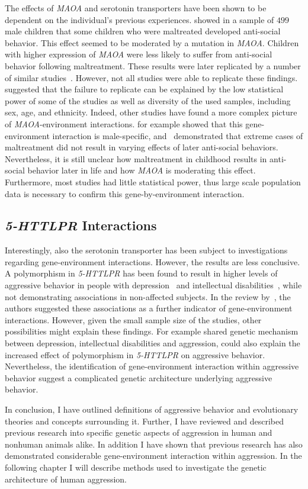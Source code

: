 The effects of \textit{MAOA} and serotonin transporters have been shown to be dependent on the individual's previous experiences.
\citet{Caspi2002} showed in a sample of $499$ male children that some children who were maltreated developed anti-social behavior.
This effect seemed to be moderated by a mutation in \textit{MAOA}.
Children with higher expression of \textit{MAOA} were less likely to suffer from anti-social behavior following maltreatment.
These results were later replicated by a number of similar studies~\cite{KimCohen2006}.
However, not all studies were able to replicate these findings.
\citet{Anholt2012} suggested that the failure to replicate can be explained by the low statistical power of some of the studies as well as diversity of the used samples, including sex, age, and ethnicity.
Indeed, other studies have found a more complex picture of \textit{MAOA}-environment interactions.
\citet{Huang2004} for example showed that this gene-environment interaction is male-specific, and~\citet{Weder2009} demonstrated that extreme cases of maltreatment did not result in varying effects of later anti-social behaviors.
Nevertheless, it is still unclear how maltreatment in childhood results in anti-social behavior later in life and how \textit{MAOA} is moderating this effect.
Furthermore, most studies had little statistical power,
thus large scale population data is necessary to confirm this gene-by-environment interaction.

\subsection{\textit{5-HTTLPR} Interactions}
\label{sub:httlpr_interactions}
Interestingly, also the serotonin transporter has been subject to investigations regarding gene-environment interactions.
However, the results are less conclusive.
A polymorphism in \textit{5-HTTLPR} has been found to result in higher levels of aggressive behavior in  people with depression~\cite{Gonda2011} and intellectual disabilities~\cite{May2010}, while not demonstrating associations in non-affected subjects.
In the review by~\citet{Anholt2012}, the authors suggested these associations as a further indicator of gene-environment interactions.
However, given the small sample size of the studies, other possibilities might explain these findings.
For example shared genetic mechanism between depression, intellectual disabilities and aggression, could also explain the increased effect of polymorphism in \textit{5-HTTLPR} on aggressive behavior. 
Nevertheless, the identification of gene-environment interaction within aggressive behavior suggest a complicated genetic architecture underlying aggressive behavior.
\bigskip

In conclusion, I have outlined definitions of aggressive behavior and evolutionary theories and concepts surrounding it.
Further, I have reviewed and described previous research into specific genetic aspects of aggression in human and nonhuman animals alike.
In addition I have shown that previous research has also demonstrated considerable gene-environment interaction within aggression.
In the following chapter I will describe methods used to investigate the genetic architecture of human aggression.
